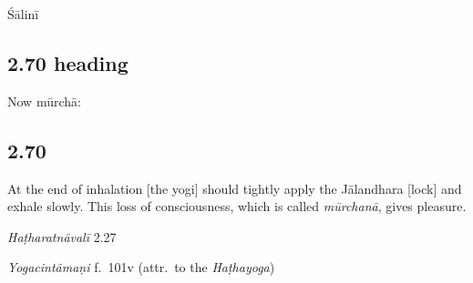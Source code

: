 \begin{ekdosis}
\begin{metre}[hp02_069]
Śālinī 
\end{metre}

\subsection*{2.70 heading}
\begin{translation}[hp02_070a]
Now mūrchā:
\end{translation}


\subsection*{2.70}
\begin{translation}[hp02_070]
At the end of inhalation [the yogi] should tightly apply the Jālandhara [lock] and exhale slowly. This loss of consciousness, which is called \emph{mūrchanā}, gives pleasure.
\end{translation}

\begin{sources}[hp02_070]
\emph{Haṭharatnāvalī} 2.27

\begin{versinnote}
\end{versinnote}

\emph{Yogacintāmaṇi} f.~101v (attr.~to the \emph{Haṭhayoga})

\begin{versinnote}
\end{versinnote}


\end{sources}
\end{ekdosis}
